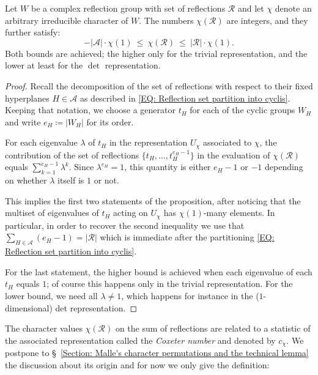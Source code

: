 \documentclass[ALCO, Unicode]{cedram}
\newcommand{\op}[1]{\operatorname{#1}}
\newcommand{\op}[1]{\operatorname{#1}}
\begin{document}
\begin{prop}\label{Prop: bounds for chi(R)}
Let $W$ be a complex reflection group with set of reflections $\mathcal{R}$ and let $\chi$ denote an arbitrary irreducible character of $W$. The numbers $\chi(\mathcal{R})$ are integers, and they further satisfy: $$-|\mathcal{A}|\cdot\chi(1)\ \leq\ \chi(\mathcal{R})\  \leq\ |\mathcal{R}|\cdot\chi(1).$$ Both bounds are achieved; the higher only for the trivial representation, and the lower at least for the $\op{det}$ representation.
\end{prop}
\begin{proof}
Recall the decomposition of the set of reflections with respect to their fixed hyperplanes $H\in\mathcal{A}$ as described in \eqref{EQ: Reflection set partition into cyclis}. Keeping that notation, we choose a generator $t_H$ for each of the cyclic groups $W_H$ and write $e_H\coloneqq |W_H|$ for its order.

For each eigenvalue $\lambda$ of $t_H$ in the representation $U_{\chi}$ associated to $\chi$, the contribution of the set of reflections $\{t_H,\ldots,t_H^{e_H-1}\}$ in the evaluation of $\chi(\mathcal{R})$ equals $\sum_{k=1}^{e_H-1}\lambda^k$. Since $\lambda^{e_H}=1$, this quantity is either $e_H-1$ or $-1$ depending on whether $\lambda$ itself is $1$ or not. 

This implies the first two statements of the proposition, after noticing that the multiset of eigenvalues of $t_H$ acting on $U_{\chi}$ has $\chi(1)$-many elements. In particular, in order to recover the second inequality we use that $\sum_{H\in\mathcal{A}}(e_H-1)=|\mathcal{R}|$ which is immediate after the partitioning \eqref{EQ: Reflection set partition into cyclis}.

For the last statement, the higher bound is achieved when each eigenvalue of each $t_H$ equals $1$; of course this happens only in the trivial representation. For the lower bound, we need all $\lambda\neq 1$, which happens for instance in the ($1$-dimensional) det representation. 
\end{proof}


The character values $\chi(\mathcal{R})$ on the sum of reflections are related to a statistic of the associated representation called the {\it Coxeter number} and denoted by $c_{\chi}$. We postpone to \S~\ref{Section: Malle's character permutations and the technical lemma} the discussion about its origin and for now we only give the definition:
\end{document}
